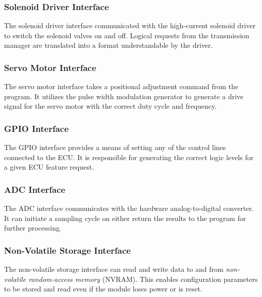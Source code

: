 \subsubsection{Solenoid Driver Interface}

The solenoid driver interface communicated with the high-current solenoid driver to switch the solenoid valves on and off. Logical requests from the transmission manager are translated into a format understandable by the driver.

\subsubsection{Servo Motor Interface}

The servo motor interface takes a positional adjustment command from the program. It utilizes the pulse width modulation generator to generate a drive signal for the servo motor with the correct duty cycle and frequency.

\subsubsection{GPIO Interface}
\label{sec:design_engine_gpio}

The GPIO interface provides a means of setting any of the control lines connected to the ECU. It is responsible for generating the correct logic levels for a given ECU feature request.

\subsubsection{ADC Interface} 
\label{sec:design_engine_adc}

The ADC interface communicates with the hardware analog-to-digital converter. It can initiate a sampling cycle on either return the results to the program for further processing.

\subsubsection{Non-Volatile Storage Interface}
\label{sec:design_engine_nvsi}

The non-volatile storage interface can read and write data to and from \emph{non-volatile random-access memory} (NVRAM). This enables configuration parameters to be stored and read even if the module loses power or is reset.
